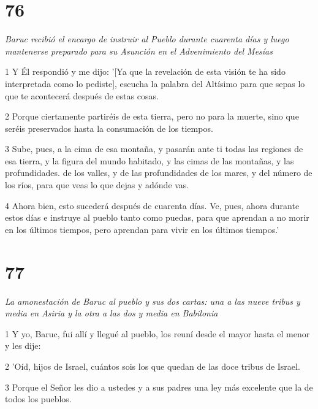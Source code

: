 \chapter{76}

\par \textit{Baruc recibió el encargo de instruir al Pueblo durante cuarenta días y luego mantenerse preparado para su Asunción en el Advenimiento del Mesías}

\par 1 Y Él respondió y me dijo: '[Ya que la revelación de esta visión te ha sido interpretada como lo pediste], escucha la palabra del Altísimo para que sepas lo que te acontecerá después de estas cosas.

\par 2 Porque ciertamente partiréis de esta tierra, pero no para la muerte, sino que seréis preservados hasta la consumación de los tiempos.

\par 3 Sube, pues, a la cima de esa montaña, y pasarán ante ti todas las regiones de esa tierra, y la figura del mundo habitado, y las cimas de las montañas, y las profundidades. de los valles, y de las profundidades de los mares, y del número de los ríos, para que veas lo que dejas y adónde vas.

\par 4 Ahora bien, esto sucederá después de cuarenta días. Ve, pues, ahora durante estos días e instruye al pueblo tanto como puedas, para que aprendan a no morir en los últimos tiempos, pero aprendan para vivir en los últimos tiempos.'

\chapter{77}

\par \textit{La amonestación de Baruc al pueblo y sus dos cartas: una a las nueve tribus y media en Asiria y la otra a las dos y media en Babilonia}


\par 1 Y yo, Baruc, fui allí y llegué al pueblo, los reuní desde el mayor hasta el menor y les dije:

\par 2 'Oíd, hijos de Israel, cuántos sois los que quedan de las doce tribus de Israel.

\par 3 Porque el Señor les dio a ustedes y a sus padres una ley más excelente que la de todos los pueblos.

